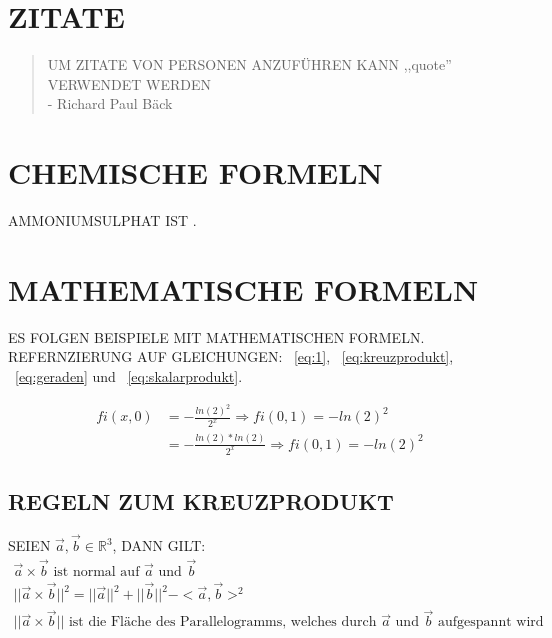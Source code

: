 \documentclass[a4paper,12pt]{report}
\begin{document}
\section{ZITATE}
\thispagestyle{fancy} %
\begin{quote}
  UM ZITATE VON PERSONEN ANZUFÜHREN KANN ,,quote'' VERWENDET WERDEN\\
  - Richard Paul Bäck
\end{quote}

\section{CHEMISCHE FORMELN}
\thispagestyle{fancy} %
AMMONIUMSULPHAT IST .

\section{MATHEMATISCHE FORMELN}
\thispagestyle{fancy} %
ES FOLGEN BEISPIELE MIT MATHEMATISCHEN FORMELN. REFERNZIERUNG AUF GLEICHUNGEN:
~\autoref{eq:1}, ~\autoref{eq:kreuzprodukt}, ~\autoref{eq:geraden} und
~\autoref{eq:skalarprodukt}.

\begin{equation}
  \label{eq:1}
  \begin{split}
    fi(x,0) & = -\frac{ln(2)^2}{2^x} \Rightarrow fi(0,1) = -ln(2)^2\\
            & = -\frac{ln(2) * ln(2)}{2^x} \Rightarrow fi(0,1) = -ln(2)^2
  \end{split}
\end{equation}

\subsection{REGELN ZUM KREUZPRODUKT}
\thispagestyle{fancy} %
SEIEN $ \vec{a}, \vec{b} \in \mathbb{R}^3 $, DANN GILT:
\begin{equation}
  \label{eq:kreuzprodukt}
  \begin{split}
    \vec{a} \times \vec{b} \text{ ist normal auf } \vec{a} \text{ und } \vec{b}\\
    || \vec{a} \times \vec{b} ||^2 = || \vec{a} ||^2 + || \vec{b} ||^2 - <\vec{a}, \vec{b}>^2\\
    || \vec{a} \times \vec{b} || \text{ ist die Fläche des
      Parallelogramms, welches durch } \vec{a} \text{ und } \vec{b}
    \text{ aufgespannt wird}
  \end{split}
\end{equation}
\end{document}

